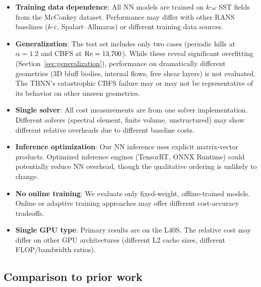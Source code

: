 \begin{itemize}
    \item \textbf{Training data dependence}: All NN models are trained on $k$-$\omega$ SST fields from the McConkey dataset. Performance may differ with other RANS baselines ($k$-$\varepsilon$, Spalart--Allmaras) or different training data sources.

    \item \textbf{Generalization}: The test set includes only two cases (periodic hills at $\alpha=1.2$ and CBFS at $\mathrm{Re}=13{,}700$). While these reveal significant overfitting (Section~\ref{sec:generalization}), performance on dramatically different geometries (3D bluff bodies, internal flows, free shear layers) is not evaluated. The TBNN's catastrophic CBFS failure may or may not be representative of its behavior on other unseen geometries.

    \item \textbf{Single solver}: All cost measurements are from one solver implementation. Different solvers (spectral element, finite volume, unstructured) may show different relative overheads due to different baseline costs.

    \item \textbf{Inference optimization}: Our NN inference uses explicit matrix-vector products. Optimized inference engines (TensorRT, ONNX Runtime) could potentially reduce NN overhead, though the qualitative ordering is unlikely to change.

    \item \textbf{No online training}: We evaluate only fixed-weight, offline-trained models. Online or adaptive training approaches may offer different cost-accuracy tradeoffs.

    \item \textbf{Single GPU type}: Primary results are on the L40S. The relative cost may differ on other GPU architectures (different L2 cache sizes, different FLOP/bandwidth ratios). 
\end{itemize}

\subsection{Comparison to prior work}

